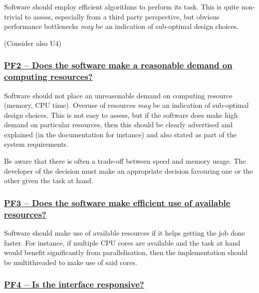 \documentclass[a4paper,11pt]{article}
\newcommand{\indicator}[1]{\subsubsection*{\underline{#1}}}
\begin{document}
Software should employ efficient algorithms to perform its task. This is quite
non-trivial to assess, especially from a third party perspective, but obvious
performance bottlenecks \emph{may} be an indication of sub-optimal design
choices.

%
%
%
(Consider also U4)

\newcommand{\pfTwoName}{PF2}
\newcommand{\pfTwoID}{\pfTwoName}
\newcommand{\pfTwoText}{Does the software make a reasonable demand on computing resources?}
\indicator{\pfTwoName{ }--{ }\pfTwoText}\label{id:pf2} 

Software should not place an unreasonable demand on computing resource (memory,
CPU time). Overuse of resources \emph{may} be an indication of sub-optimal
design choices.  This is not easy to assess, but if the software does make high
demand on particular resources, then this should be clearly advertised and
explained (in the documentation for instance) and also stated as part of the
system requirements.

Be aware that there is often a trade-off between speed and memory usage. The
developer of the decision must make an appropriate decision favouring one or the other
given the task at hand. 

\newcommand{\pfThreeName}{PF3}
\newcommand{\pfThreeID}{\pfThreeName}
\newcommand{\pfThreeText}{Does the software make efficient use of available resources?}
\indicator{\pfThreeName{ }--{ }\pfThreeText}\label{id:pf3} 

Software should make use of available resources if it helps getting the job
done faster. For instance, if multiple CPU cores are available and the task at hand
would benefit significantly from parallelisation, then the implementation should be
multithreaded to make use of said cores.

\newcommand{\pfFourName}{PF4}
\newcommand{\pfFourID}{\pfFourName}
\newcommand{\pfFourText}{Is the interface responsive?}
\indicator{\pfFourName{ }--{ }\pfFourText}\label{id:pf4}
\end{document}
